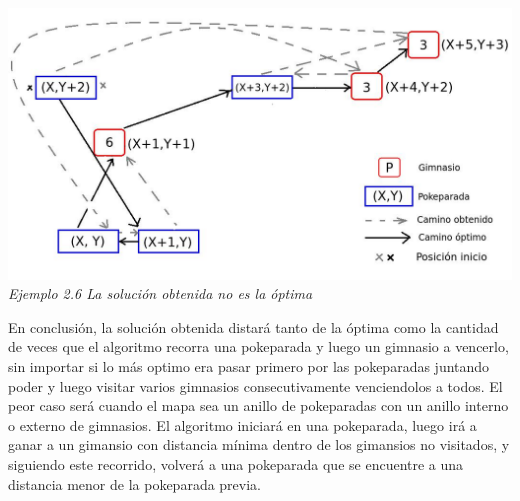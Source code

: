 \vspace*{0.3cm} \vspace*{0.3cm}
  \begin{center}
\includegraphics[scale=0.60]{./EJ2/nooptima2.jpeg}
\\{\textit{Ejemplo 2.6 La soluci\'on obtenida no es la \'optima}}
  \end{center}
  \vspace*{0.3cm}


En conclusi\'on, la soluci\'on obtenida distará tanto de la óptima como la cantidad de veces que el algoritmo recorra una pokeparada y luego un gimnasio a vencerlo, sin importar si lo más optimo era pasar primero por las pokeparadas juntando poder y luego visitar varios gimnasios consecutivamente venciendolos a todos.
El peor caso será cuando el mapa sea un anillo de pokeparadas con un anillo interno o externo de gimnasios. 
El algoritmo iniciará en una pokeparada, luego irá a ganar a un gimansio con distancia mínima dentro de los gimansios no visitados, y siguiendo este recorrido, volverá a una pokeparada que se encuentre a una distancia menor de la pokeparada previa.\\



